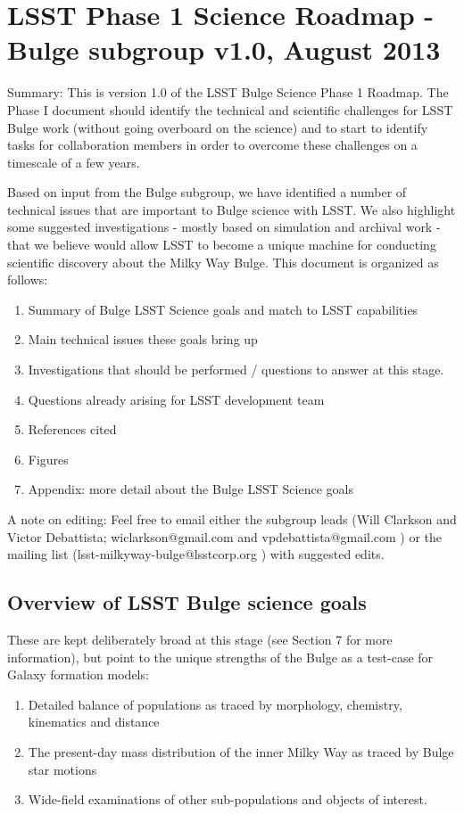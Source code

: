 \section{LSST Phase 1 Science Roadmap - Bulge subgroup v1.0, August 2013}

Summary: This is version 1.0 of the LSST Bulge Science Phase 1 Roadmap. The Phase I document should identify the technical and scientific challenges for LSST Bulge work (without going overboard on the science) and to start to identify tasks for collaboration members in order to overcome these challenges on a timescale of a few years. 

Based on input from the Bulge subgroup, we have identified a number of technical issues that are important to Bulge science with LSST. We also highlight some suggested investigations - mostly based on simulation and archival work - that we believe would allow LSST to become a unique machine for conducting scientific discovery about the Milky Way Bulge. This document is organized as follows: 
\begin{enumerate}
\item Summary of Bulge LSST Science goals and match to LSST capabilities
\item Main technical issues these goals bring up 
\item Investigations that should be performed / questions to answer at this stage. 
\item Questions already arising for LSST development team 
\item References cited 
\item Figures 
\item Appendix: more detail about the Bulge LSST Science goals 
\end{enumerate}

A note on editing: Feel free to email either the subgroup leads (Will Clarkson and Victor Debattista; 
wiclarkson@gmail.com and vpdebattista@gmail.com ) or the mailing list (lsst-milkyway-bulge@lsstcorp.org ) with suggested edits. 

\subsection{Overview of LSST Bulge science goals}

These are kept deliberately broad at this stage (see Section 7 for more information), but point to the unique strengths of the Bulge as a test-case for Galaxy formation models: 
\begin{enumerate}
\item Detailed balance of populations as traced by morphology, chemistry, kinematics and distance 
\item The present-day mass distribution of the inner Milky Way as traced by Bulge star motions 
\item Wide-field examinations of other sub-populations and objects of interest. 
\end{enumerate}

